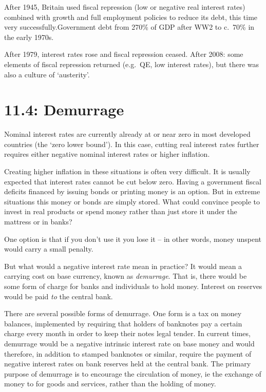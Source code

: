 \documentclass[]{tufte-handout}
\begin{document}
After 1945, Britain used fiscal repression (low or negative real
interest rates) combined with growth and full employment policies to
reduce its debt, this time very successfully.Government debt from 270\%
of GDP after WW2 to c.~70\% in the early 1970s.

After 1979, interest rates rose and fiscal repression ceased. After
2008: some elements of fiscal repression returned (e.g.~QE, low interest
rates), but there was also a culture of `austerity'.

\hypertarget{demurrage}{%
\section{11.4: Demurrage}\label{demurrage}}

Nominal interest rates are currently already at or near zero in most
developed countries (the `zero lower bound'). In this case, cutting real
interest rates further requires either negative nominal interest rates
or higher inflation.

Creating higher inflation in these situations is often very difficult.
It is usually expected that interest rates cannot be cut below zero.
Having a government fiscal deficits financed by issuing bonds or
printing money is an option. But in extreme situations this money or
bonds are simply stored. What could convince people to invest in real
products or spend money rather than just store it under the mattress or
in banks?

One option is that if you don't use it you lose it -- in other words,
money unspent would carry a small penalty.

But what would a negative interest rate mean in practice? It would mean
a carrying cost on base currency, known as \emph{demurrage}. That is,
there would be some form of charge for banks and individuals to hold
money. Interest on reserves would be paid \emph{to} the central bank.

There are several possible forms of demurrage. One form is a tax on
money balances, implemented by requiring that holders of banknotes pay a
certain charge every month in order to keep their notes legal tender. In
current times, demurrage would be a negative intrinsic interest rate on
base money and would therefore, in addition to stamped banknotes or
similar, require the payment of negative interest rates on bank reserves
held at the central bank. The primary purpose of demurrage is to
encourage the circulation of money, ie the exchange of money to for
goods and services, rather than the holding of money.
\end{document}
